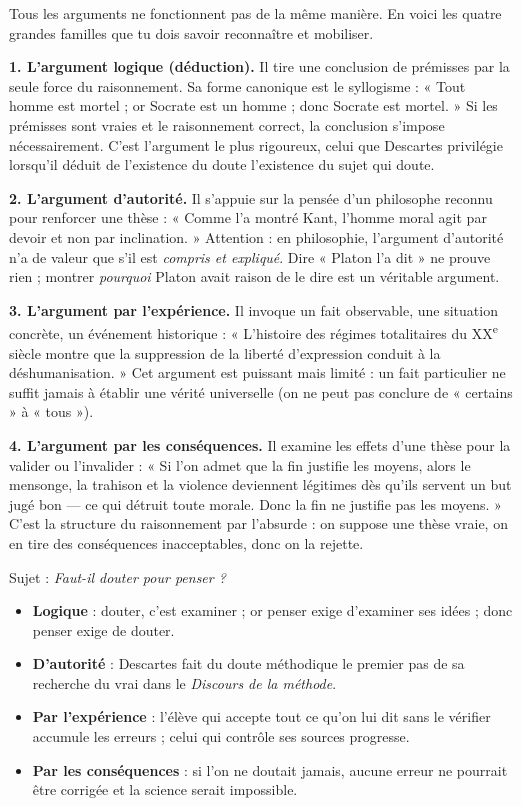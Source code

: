 \documentclass[11pt]{article}
\begin{document}
Tous les arguments ne fonctionnent pas de la même manière. En voici les quatre grandes familles que tu dois savoir reconnaître et mobiliser.

\textbf{1. L'argument logique (déduction).} Il tire une conclusion de prémisses par la seule force du raisonnement. Sa forme canonique est le syllogisme : « Tout homme est mortel ; or Socrate est un homme ; donc Socrate est mortel. » Si les prémisses sont vraies et le raisonnement correct, la conclusion s'impose nécessairement. C'est l'argument le plus rigoureux, celui que Descartes privilégie lorsqu'il déduit de l'existence du doute l'existence du sujet qui doute.

\textbf{2. L'argument d'autorité.} Il s'appuie sur la pensée d'un philosophe reconnu pour renforcer une thèse : « Comme l'a montré Kant, l'homme moral agit par devoir et non par inclination. » Attention : en philosophie, l'argument d'autorité n'a de valeur que s'il est \emph{compris et expliqué}. Dire « Platon l'a dit » ne prouve rien ; montrer \emph{pourquoi} Platon avait raison de le dire est un véritable argument.

\textbf{3. L'argument par l'expérience.} Il invoque un fait observable, une situation concrète, un événement historique : « L'histoire des régimes totalitaires du XX\textsuperscript{e} siècle montre que la suppression de la liberté d'expression conduit à la déshumanisation. » Cet argument est puissant mais limité : un fait particulier ne suffit jamais à établir une vérité universelle (on ne peut pas conclure de « certains » à « tous »).

\textbf{4. L'argument par les conséquences.} Il examine les effets d'une thèse pour la valider ou l'invalider : « Si l'on admet que la fin justifie les moyens, alors le mensonge, la trahison et la violence deviennent légitimes dès qu'ils servent un but jugé bon — ce qui détruit toute morale. Donc la fin ne justifie pas les moyens. » C'est la structure du raisonnement par l'absurde : on suppose une thèse vraie, on en tire des conséquences inacceptables, donc on la rejette.

\begin{exemplebox}
Sujet : \emph{Faut-il douter pour penser ?}
\begin{itemize}
\item \textbf{Logique} : douter, c'est examiner ; or penser exige d'examiner ses idées ; donc penser exige de douter.
\item \textbf{D'autorité} : Descartes fait du doute méthodique le premier pas de sa recherche du vrai dans le \emph{Discours de la méthode}.
\item \textbf{Par l'expérience} : l'élève qui accepte tout ce qu'on lui dit sans le vérifier accumule les erreurs ; celui qui contrôle ses sources progresse.
\item \textbf{Par les conséquences} : si l'on ne doutait jamais, aucune erreur ne pourrait être corrigée et la science serait impossible.
\end{itemize}
\end{exemplebox}
\end{document}
